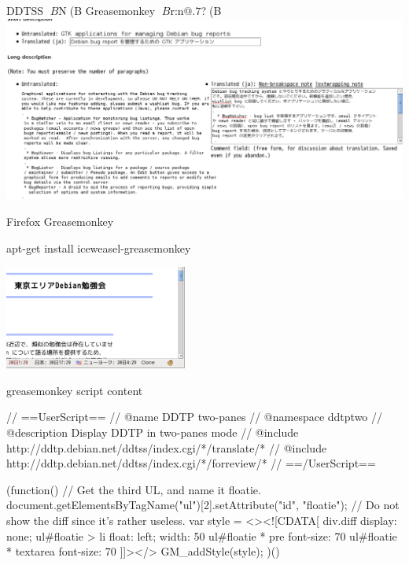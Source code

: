 \begin{frame}{DDTSS $B$N(B Greasemonkey $B$r:n@.$7$?(B}
 \includegraphics[width=1.2\hsize]{image200906/ddtss-greasemonkey.png}
\end{frame}

\begin{frame}[containsverbatim]{Firefox Greasemonkey}
\begin{commandline}
 apt-get install iceweasel-greasemonkey
\end{commandline}
\includegraphics[width=6cm]{image200906/greasemonkey.png}
\end{frame}

\begin{frame}[containsverbatim]{greasemonkey script content}

\begin{commandline}
// ==UserScript==
// @name           DDTP two-panes
// @namespace      ddtptwo
// @description    Display DDTP in two-panes mode
// @include        http://ddtp.debian.net/ddtss/index.cgi/*/translate/*
// @include        http://ddtp.debian.net/ddtss/index.cgi/*/forreview/*
// ==/UserScript==

(function() {
    // Get the third UL, and name it floatie.
    document.getElementsByTagName("ul")[2].setAttribute("id", "floatie");
    // Do not show the diff since it's rather useless.
    var style =
	<><![CDATA[
		   div.diff {
		       display: none;
		   }
		   ul#floatie > li {
		       float: left;
		       width: 50%
		   }
		   ul#floatie * pre {
		       font-size: 70%
		   }
		   ul#floatie * textarea {
		       font-size: 70%
		   }
		   ]]></>
    GM_addStyle(style);
})()
\end{commandline}

\end{frame}

